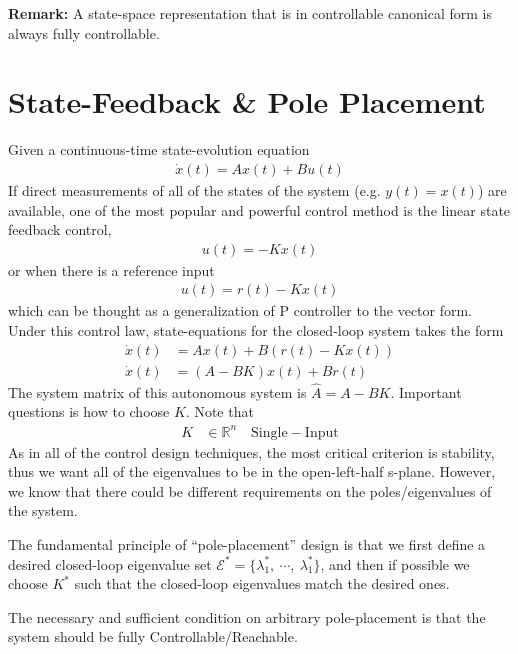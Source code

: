 \documentclass[twoside]{article}
\begin{document}
\textbf{Remark:} A state-space representation that is
in controllable canonical form is always fully controllable.

\newpage

\section{State-Feedback \& Pole Placement}

Given a continuous-time state-evolution equation
%
\begin{align*}
  \dot{x}(t) = A x(t) + B u(t)
\end{align*}
%
If direct measurements of all of the states of the
system (e.g. $y(t) = x(t)$) are available, one of the most
popular and powerful control method is the linear state feedback
control,
%
\begin{align*}
 u(t) = - K x(t)
\end{align*}
%
or when there is a reference input 
%
\begin{align*}
 u(t) = r(t) - K x(t)
\end{align*}
%
which can be thought as a generalization of P controller
to the vector form. Under this control law, state-equations
for the closed-loop system takes the form
%
\begin{align*}
  \dot{x}(t) &= A x(t) + B \left( r(t) - K x(t) \right)
  \\
  \dot{x}(t) &= \left( A - B K \right) x(t) + B r(t) 
\end{align*}
%
The system matrix of this autonomous system is
$\hat{A} = A - B K$. 
%
Important questions is how to choose $K$. Note that 
%
\begin{align*}
  K &\in \mathbb{R}^n \quad \mathrm{Single-Input} 
\end{align*}
%
As in all of the control design techniques, the most critical criterion
is stability, thus we want all of the eigenvalues to be in the
open-left-half s-plane. However, we know that there could be 
different requirements on the poles/eigenvalues of the system.

The fundamental principle of ``pole-placement'' design is that
we first define a desired closed-loop eigenvalue set 
$\mathcal{E}^* = \lbrace \lambda_1^* , \ \cdots, \  \lambda_1^* \rbrace$, and
then if possible we choose $K^*$ such that the closed-loop
eigenvalues match the desired ones.

The necessary and sufficient condition on arbitrary pole-placement
is that the system should be fully Controllable/Reachable.
\end{document}
